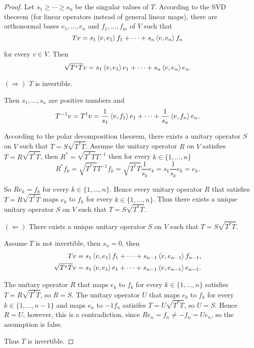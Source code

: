 \begin{proof}
    Let $s_{1}\geq \cdots \geq s_{n}$ be the singular values of $T$. According to the SVD theorem (for linear operators instead of general linear maps), there are orthonormal bases $e_{1}, \ldots, e_{n}$ and $f_{1}, \ldots, f_{m}$ of $V$ such that
    \[
        Tv = s_{1}\left\langle{v,e_{1}}\right\rangle f_{1} + \cdots + s_{n}\left\langle{v,e_{n}}\right\rangle f_{n}
    \]

    for every $v\in V$. Then
    \[
        \sqrt{T^{*}T}v =  s_{1}\left\langle{v,e_{1}}\right\rangle e_{1} + \cdots + s_{n}\left\langle{v,e_{n}}\right\rangle e_{n}.
    \]

    $(\Rightarrow)$ $T$ is invertible.

    Then $s_{1}, \ldots, s_{n}$ are positive numbers and
    \[
        T^{-1}v = T^{\dagger}v = \frac{1}{s_{1}}\left\langle{v,f_{1}}\right\rangle e_{1} + \cdots + \frac{1}{s_{n}}\left\langle{v,f_{n}}\right\rangle e_{n}.
    \]

    According to the polar decomposition theorem, there exists a unitary operator $S$ on $V$ such that $T = S\sqrt{T^{*}T}$. Assume the unitary operator $R$ on $V$ satisfies $T = R\sqrt{T^{*}T}$, then $R^{*} = \sqrt{T^{*}T}T^{-1}$ then for every $k\in\{1,\ldots,n\}$
    \[
        R^{*}f_{k} = \sqrt{T^{*}T}T^{-1}f_{k} = \sqrt{T^{*}T}\frac{1}{s_{k}}e_{k} = s_{k}\frac{1}{s_{k}}e_{k} = e_{k}.
    \]

    So $Re_{k} = f_{k}$ for every $k\in\{1,\ldots,n\}$. Hence every unitary operator $R$ that satisfies $T = R\sqrt{T^{*}T}$ maps $e_{k}$ to $f_{k}$ for every $k\in\{1,\ldots,n\}$. Thus there exists a unique unitary operator $S$ on $V$ such that $T = S\sqrt{T^{*}T}$.
    \bigskip

    $(\Leftarrow)$ There exists a unique unitary operator $S$ on $V$ such that $T = S\sqrt{T^{*}T}$.

    Assume $T$ is not invertible, then $s_{n} = 0$, then
    \begin{align*}
        Tv             & = s_{1}\left\langle{v,e_{1}}\right\rangle f_{1} + \cdots + s_{n-1}\left\langle{v,e_{n-1}}\right\rangle f_{n-1},  \\
        \sqrt{T^{*}T}v & =  s_{1}\left\langle{v,e_{1}}\right\rangle e_{1} + \cdots + s_{n-1}\left\langle{v,e_{n-1}}\right\rangle e_{n-1}.
    \end{align*}

    The unitary operator $R$ that maps $e_{k}$ to $f_{k}$ for every $k\in \{ 1,\ldots, n \}$ satisfies $T = R\sqrt{T^{*}T}$, so $R = S$. The unitary operator $U$ that maps $e_{k}$ to $f_{k}$ for every $k\in \{ 1,\ldots, n-1 \}$ and maps $e_{n}$ to $-1f_{n}$ satisifes $T = U\sqrt{T^{*}T}$, so $U = S$. Hence $R = U$, however, this is a contradiction, since $Re_{n} = f_{n}\ne -f_{n} = Ue_{n}$, so the assumption is false.

    Thus $T$ is invertible.
\end{proof}
\newpage

